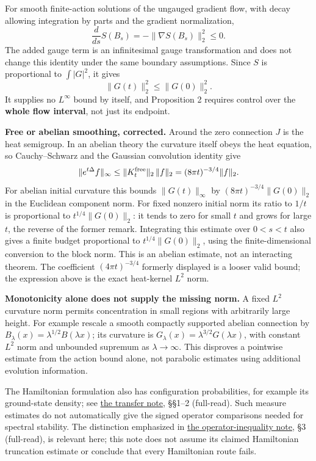 \documentclass[11pt,a4paper]{article}
\begin{document}
For smooth finite-action solutions of the ungauged gradient flow, with
decay allowing integration by parts and the gradient normalization,
\[\frac{d}{ds}S(B_s)=-\|\nabla S(B_s)\|_2^2\le0.\] The added gauge term
is an infinitesimal gauge transformation and does not change this
identity under the same boundary assumptions. Since \(S\) is
proportional to \(\int|G|^2\), it gives \[\|G(t)\|_2^2\le\|G(0)\|_2^2.\]
It supplies no \(L^\infty\) bound by itself, and Proposition 2 requires
control over the \textbf{whole flow interval}, not just its endpoint.

\textbf{Free or abelian smoothing, corrected.} Around the zero
connection \(J\) is the heat semigroup. In an abelian theory the
curvature itself obeys the heat equation, so Cauchy--Schwarz and the
Gaussian convolution identity give \[\|e^{t\Delta}f\|_\infty
\le\|K_t^{\rm free}\|_2\,\|f\|_2
=(8\pi t)^{-3/4}\|f\|_2.\] For abelian initial curvature this bounds
\(\|G(t)\|_\infty\) by \((8\pi t)^{-3/4}\|G(0)\|_2\) in the Euclidean
component norm. For fixed nonzero initial norm its ratio to \(1/t\) is
proportional to \(t^{1/4}\|G(0)\|_2\): it tends to zero for small \(t\)
and grows for large \(t\), the reverse of the former remark. Integrating
this estimate over \(0<s<t\) also gives a finite budget proportional to
\(t^{1/4}\|G(0)\|_2\), using the finite-dimensional conversion to the
block norm. This is an abelian estimate, not an interacting theorem. The
coefficient \((4\pi t)^{-3/4}\) formerly displayed is a looser valid
bound; the expression above is the exact heat-kernel \(L^2\) norm.

\textbf{Monotonicity alone does not supply the missing norm.} A fixed
\(L^2\) curvature norm permits concentration in small regions with
arbitrarily large height. For example rescale a smooth compactly
supported abelian connection by
\(B_\lambda(x)=\lambda^{1/2}B(\lambda x)\); its curvature is
\(G_\lambda(x)=\lambda^{3/2}G(\lambda x)\), with constant \(L^2\) norm
and unbounded supremum as \(\lambda\to\infty\). This disproves a
pointwise estimate from the action bound alone, not parabolic estimates
using additional evolution information.

The Hamiltonian formulation also has configuration probabilities, for
example its ground-state density; see
\href{ground-state-measure-transfer.md}{the transfer note}, §§1--2
(full-read). Such measure estimates do not automatically give the signed
operator comparisons needed for spectral stability. The distinction
emphasized in \href{large-field-operator-inequality.md}{the
operator-inequality note}, §3 (full-read), is relevant here; this note
does not assume its claimed Hamiltonian truncation estimate or conclude
that every Hamiltonian route fails.
\end{document}
